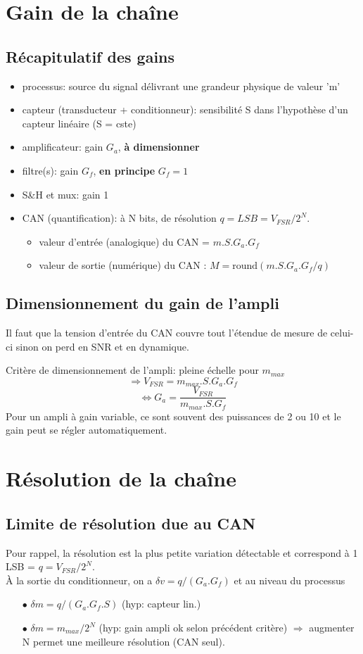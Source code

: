 \section{Gain de la chaîne}
\subsection{Récapitulatif des gains}
\begin{itemize}
	\item processus: source du signal délivrant une grandeur physique de valeur 'm'
	\item capteur (transducteur + conditionneur): sensibilité S dans l'hypothèse d'un capteur linéaire (S = cste)
	\item amplificateur: gain \(G_a\), \textbf{à dimensionner}
	\item filtre(s): gain \(G_f\), \textbf{en principe} \(G_f = 1\)
	\item S\&H et mux: gain 1
	\item CAN (quantification): à N bits, de résolution \(q=LSB=V_{FSR}/2^N\).
	\begin{itemize}
		\item valeur d'entrée (analogique) du CAN = \(m.S.G_a.G_f\)
		\item valeur de sortie (numérique) du CAN : \(M=\text{round}(m.S.G_a.G_f/q)\)
	\end{itemize}
\end{itemize}
\subsection{Dimensionnement du gain de l'ampli}
Il faut que la tension d'entrée du CAN couvre tout l'étendue de mesure de celui-ci sinon on perd en SNR et en dynamique.\bigbreak

Critère de dimensionnement de l'ampli: pleine échelle pour \(m_{max}\)
\[\Rightarrow V_{FSR} = m_{max}.S.G_a.G_f\]
\[\Leftrightarrow G_a=\frac{V_{FSR}}{m_{max}.S.G_f}\]
Pour un ampli à gain variable, ce sont souvent des puissances de 2 ou 10 et le gain peut se régler automatiquement.
\section{Résolution de la chaîne}
\subsection{Limite de résolution due au CAN}
Pour rappel, la résolution est la plus petite variation détectable et correspond à 1 LSB = \(q = V_{FSR}/2^N\).\\
À la sortie du conditionneur, on a \(\delta v=q/(G_a.G_f)\) et au niveau du processus \begin{itemize}
	\item[\(\bullet\)] \(\delta m = q/(G_a.G_f.S)\) (hyp: capteur lin.)
	\item[\(\bullet\)] \(\delta m = m_{max}/2^N\) (hyp: gain ampli ok selon précédent critère) \(\Rightarrow\) augmenter N permet une meilleure résolution (CAN seul).
\end{itemize}

